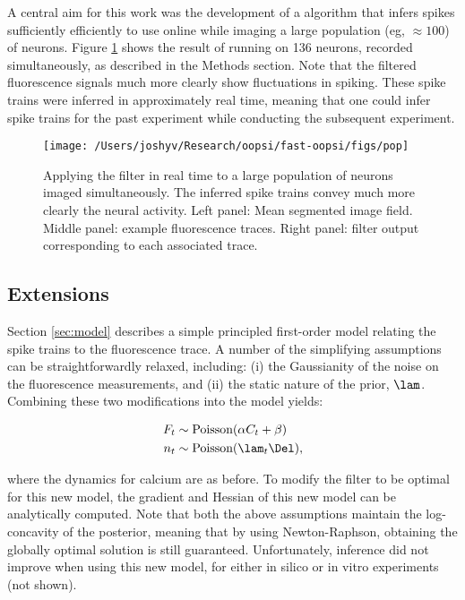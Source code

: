 A central aim for this work was the development of a algorithm that infers spikes sufficiently efficiently to use online while imaging a large population (eg, $\approx 100$) of neurons.  Figure \ref{fig:pop} shows the result of running \foopsi on 136 neurons, recorded simultaneously, as described in the Methods section.  Note that the filtered fluorescence signals much more clearly show fluctuations in spiking. These spike trains were inferred in approximately real time, meaning that one could infer spike trains for the past experiment while conducting the subsequent experiment.


\begin{figure}[h!]
\centering \texttt{[image: /Users/joshyv/Research/oopsi/fast-oopsi/figs/pop]}
\caption[\foopsi filter is robust and works online for populations of neurons]{Applying the \foopsi filter in real time to a large population of neurons imaged simultaneously.  The inferred spike trains convey much more clearly the neural activity.  Left panel: Mean segmented image field.  Middle panel: example fluorescence traces.  Right panel: \foopsi filter output corresponding to each associated trace.} \label{fig:pop}
\end{figure}


\subsection{Extensions}

Section \ref{sec:model} describes a simple principled first-order model relating the spike trains to the fluorescence trace. A number of the simplifying assumptions can be straightforwardly relaxed, including: (i) the Gaussianity of the noise on the fluorescence measurements, and (ii) the static nature of the prior, $\lam$.  Combining these two modifications into the model yields:


\begin{align}
	F_t &\sim \text{Poisson}(\alpha C_t + \beta) \label{eq:nonlin} \\
	n_t &\sim \text{Poisson}(\lam_t \Del),
\end{align}

\noindent where the dynamics for calcium are as before.  To modify the \foopsi filter to be optimal for this new model, the gradient and Hessian of this new model can be analytically computed.  Note that both the above assumptions maintain the log-concavity of the posterior, meaning that by using Newton-Raphson, obtaining the globally optimal solution is still guaranteed. Unfortunately, inference did not improve when using this new model, for either in silico or in vitro experiments (not shown).


